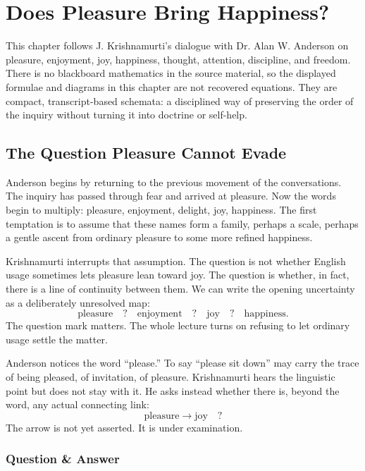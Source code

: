 \chapter{Does Pleasure Bring Happiness?}

This chapter follows J. Krishnamurti's dialogue with Dr. Alan W. Anderson on pleasure, enjoyment, joy, happiness, thought, attention, discipline, and freedom. There is no blackboard mathematics in the source material, so the displayed formulae and diagrams in this chapter are not recovered equations. They are compact, transcript-based schemata: a disciplined way of preserving the order of the inquiry without turning it into doctrine or self-help.

\section{The Question Pleasure Cannot Evade}

Anderson begins by returning to the previous movement of the conversations. The inquiry has passed through fear and arrived at pleasure. Now the words begin to multiply: pleasure, enjoyment, delight, joy, happiness. The first temptation is to assume that these names form a family, perhaps a scale, perhaps a gentle ascent from ordinary pleasure to some more refined happiness.

Krishnamurti interrupts that assumption. The question is not whether English usage sometimes lets pleasure lean toward joy. The question is whether, in fact, there is a line of continuity between them. We can write the opening uncertainty as a deliberately unresolved map:
\begin{equation}
\text{pleasure} \quad ? \quad \text{enjoyment} \quad ? \quad \text{joy} \quad ? \quad \text{happiness}.
\end{equation}
The question mark matters. The whole lecture turns on refusing to let ordinary usage settle the matter.

Anderson notices the word ``please.'' To say ``please sit down'' may carry the trace of being pleased, of invitation, of pleasure. Krishnamurti hears the linguistic point but does not stay with it. He asks instead whether there is, beyond the word, any actual connecting link:
\begin{equation}
\text{pleasure} \longrightarrow \text{joy} \quad ?
\end{equation}
The arrow is not yet asserted. It is under examination.

\subsection{Question \& Answer}

